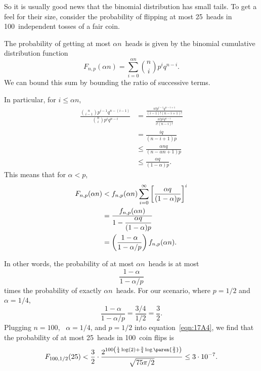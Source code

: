 \begin{editingnotes}
So it is usually good news that the binomial distribution has small
tails.  To get a feel for their size, consider the probability of
flipping at most 25~heads in 100~independent tosses of a fair coin.

The probability of getting at most $\alpha n$~heads is given by
the binomial cumulative distribution function
\begin{equation}\label{LN12:Jsum}
F_{n, p}(\alpha n)
    = \sum_{i = 0}^{\alpha n} \binom{n}{i} p^i q^{n - i}.
\end{equation}
We can bound this sum by bounding the ratio of successive terms.

In particular, for $i \le \alpha n$,
\begingroup
{}
\begin{align*}
\frac{ \displaystyle \binom{n}{i - 1} p^{i - 1} q^{n - (i - 1)} }
     { \displaystyle \binom{n}{i}     p^i       q^{n - i} }
    &=    \frac{\displaystyle
                  \frac{ n! p^{i - 1} q^{n - i + 1} }
                       { (i - 1)! (n - i + 1) ! }
              }
              {\displaystyle
                  \frac{ n! p^i q^{n - i} }
                       { i! (n - i)! }
              } \\
    &=    \frac{ i q }{ (n - i + 1) p } \\
    &\le  \frac{ \alpha n q }{ (n - \alpha n + 1) p } \\
    &\le  \frac{ \alpha q }{ (1 - \alpha) p }.
\end{align*}
\endgroup
This means that for $\alpha < p$,
\begingroup
{}
\begin{align}
F_{n, p}(\alpha n)
    &<  f_{n, p}(\alpha n)
        \sum_{i = 0}^\infty \left[ \frac{\alpha q}{(1 - \alpha)p}\right]^i
\notag \\
    &= \frac{\displaystyle f_{n, p}(\alpha n)}
            {\displaystyle 1 - \frac{\alpha q}{(1 - \alpha)p}}
            \notag\\
    &= \left( \frac{1 - \alpha}{1 - \alpha/p} \right) f_{n, p}(\alpha n).
\label{eqn:16F7}
\end{align}
\endgroup

In other words, the probability of at most $\alpha n$~heads is at most
\begin{equation*}
    \frac{1 - \alpha}{1 - \alpha/p}
\end{equation*}
times the probability of exactly $\alpha n$~heads. For our scenario,
where $p = 1/2$ and $\alpha = 1/4$,
\begin{equation*}
\frac{1 - \alpha}{1 - \alpha/p}
    = \frac{3/4}{1/2} %
    = \frac{3}{2}.
\end{equation*}
Plugging $n = 100$, \ $\alpha = 1/4$, and $p = 1/2$ into
equation~\eqref{eqn:17A4}, we find that the probability of at most
25~heads in 100~coin flips is
\begin{equation*}
F_{100, 1/2}(25)
    < \frac{3}{2} \cdot
        \frac{  \displaystyle
                2^{100 \left( \frac{1}{4} \log(2)
                     + \frac{3}{4} \log\paren{\frac{2}{3}} \right) }
             }
             { \sqrt{75 \pi /2} } %
    \le 3 \cdot 10^{-7}.
\end{equation*}


\end{editingnotes}
